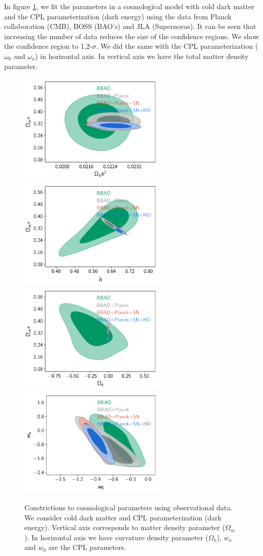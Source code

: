 \documentclass[onecolumn,           %
               showpacs,            %
               preprintnumbers,     %
               aps,                 %
               letterpaper,             %
               superscriptaddress,      %
               nofootinbib,         %
               tightenlines,        %
               floats,floatfix      %
               ,usenatbib,
               ]{revtex4-1}
\begin{document}
In figure \ref{cosmo1}, we fit the parameters in a cosmological model with cold dark matter and the CPL parameterization (dark energy) using the data from Planck collaboration (CMB), BOSS (BAO's) and JLA (Supernovas). It can be seen that increasing the number of data reduces the size of the confidence regions. We show the confidence region to 1,2-$\sigma$. We did the same with the CPL parameterization ($\omega_0$ and  $\omega_a$) in horizontal axis. In vertical axis we have the total matter density parameter.
\begin{figure}[htp]
	\centering
	\includegraphics[width=7cm]{FiguresCosmo/Obh2_Om_owaCDM_todas.pdf}	
	\includegraphics[width=7cm]{FiguresCosmo/h_Om_owaCDM_todas.pdf}
	\includegraphics[width=7cm]{FiguresCosmo/Ok_Om_owaCDM_todas}
	\includegraphics[width=7cm]{FiguresCosmo/w0_wa_owaCDM_todas}
	\caption{Constrictions to cosmological parameters using observational data. We consider cold dark matter and CPL parameterization (dark energy). Vertical axis corresponds to matter density parameter ($\Omega_m$). In horizontal axis we have curvature density parameter ($\Omega_k$), $w_a$ and $w_0$ are the CPL parameters.}
	\label{cosmo1}
\end{figure}
\end{document}

